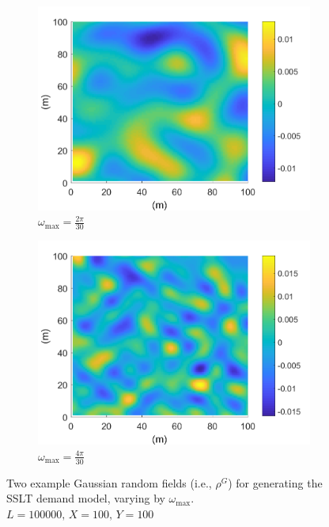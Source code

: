 \documentclass[12pt,dvipsnames]{report}
\begin{document}
\begin{figure}[!ht]
\centering
\begin{subfigure}{.45\textwidth}
	\centering
	\includegraphics[width=1\linewidth]{rhoG_O2pi-300_L100000_X100_Y100}
	\caption{\small $\omega_{\max}=\frac{2\pi}{30}$}
	\label{fig:rhoG_2pi-300}
\end{subfigure}
\hspace{0.5cm}
\begin{subfigure}{.45\textwidth}
	\centering
	\includegraphics[width=1\linewidth]{rhoG_O4pi-300_L100000_X100_Y100}
	\caption{\small $\omega_{\max}=\frac{4\pi}{30}$}
	\label{fig:rhoG_4pi-300}
\end{subfigure}
\caption[Example Gaussian random fields for SSLT demand model generation]{\small Two example Gaussian random fields (i.e., $\rho^G$) for generating the SSLT demand model, varying by $\omega_{\max}$.  $L = 100000,\, X = 100,\, Y = 100$}
\label{fig:rhoG}
\end{figure}
\end{document}
